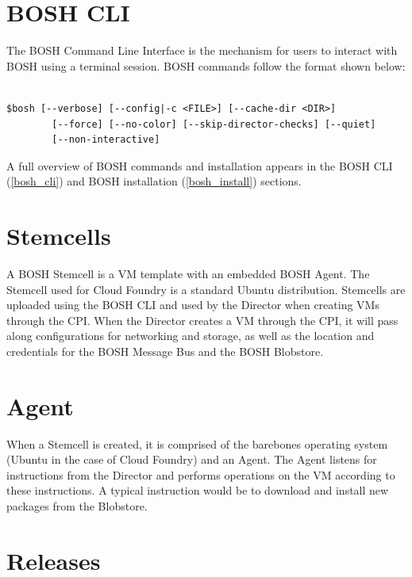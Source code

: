 \section{BOSH CLI}
\label{boshcli}

The BOSH Command Line Interface is the mechanism for users to interact with BOSH using a terminal session. BOSH commands follow the format shown below:

\begin{adjustwidth}{2.5em}{2.5em}
\begin{verbatim}

$bosh [--verbose] [--config|-c <FILE>] [--cache-dir <DIR>]
        [--force] [--no-color] [--skip-director-checks] [--quiet]
        [--non-interactive]

\end{verbatim}
\end{adjustwidth}

A full overview of BOSH commands and installation appears in the BOSH CLI (\autoref{bosh_cli}) and BOSH installation (\autoref{bosh_install}) sections.

\section{Stemcells}
\label{stemcells}

A BOSH Stemcell is a VM template with an embedded BOSH Agent. The Stemcell used for Cloud Foundry is a standard Ubuntu distribution. Stemcells are uploaded using the BOSH CLI and used by the Director when creating VMs through the CPI. When the Director creates a VM through the CPI, it will pass along configurations for networking and storage, as well as the location and credentials for the BOSH Message Bus and the BOSH Blobstore.

\section{Agent}
\label{agent}

When a Stemcell is created, it is comprised of the barebones operating system (Ubuntu in the case of Cloud Foundry) and an Agent. The Agent listens for instructions from the Director and performs operations on the VM according to these instructions. A typical instruction would be to download and install new packages from the Blobstore.

\section{Releases}
\label{releases}

